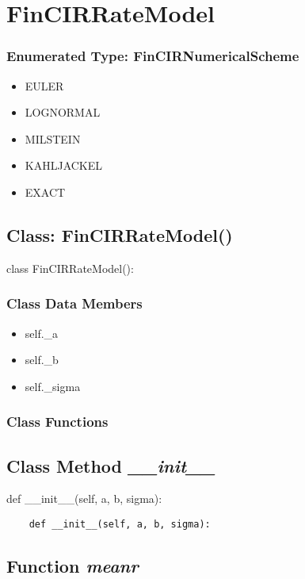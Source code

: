 \documentclass[twoside,11pt]{book}
\begin{document}
\newpage
\section{FinCIRRateModel}

\subsubsection{Enumerated Type: FinCIRNumericalScheme}
\begin{itemize}
\item{EULER}
\item{LOGNORMAL}
\item{MILSTEIN}
\item{KAHLJACKEL}
\item{EXACT}
\end{itemize}

\subsection{Class: FinCIRRateModel()}
class FinCIRRateModel():

\subsubsection{Class Data Members}
\begin{itemize}
\item{self.\_a}
\item{self.\_b}
\item{self.\_sigma}
\end{itemize}

\subsubsection{Class Functions}

\subsection{Class Method {\it \_\_init\_\_}}
def \_\_init\_\_(self, a, b, sigma):

\begin{lstlisting}
    def __init__(self, a, b, sigma):
\end{lstlisting}

\subsection{Function {\it meanr}}
\end{document}
